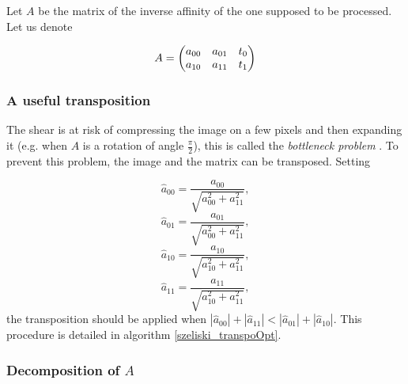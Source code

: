 	Let $A$ be the matrix of the inverse affinity of the one supposed to be processed. Let us denote

\[A = \begin{pmatrix} a_{00} & a_{01} & t_0\\ a_{10} & a_{11} & t_1 \end{pmatrix}\]

	
	
	
	\subsubsection{A useful transposition}
		\label{szeliski_transpoOpt_section}
		
		The shear is at risk of compressing the image on a few pixels and then expanding it (e.g. when $A$ is a rotation of angle $\frac{\pi}{2}$), this is called the \emph{bottleneck problem} \cite{wolberg1990digital}. To prevent this problem, the image and the matrix can be transposed. Setting
		
		
		\[\hat a_{00} = \frac{a_{00}}{\sqrt{a_{00}^2+a_{11}^2}},\]
		\[\hat a_{01} = \frac{a_{01}}{\sqrt{a_{00}^2+a_{11}^2}},\]
		\[\hat a_{10} = \frac{a_{10}}{\sqrt{a_{10}^2+a_{11}^2}},\]
		\[\hat a_{11} = \frac{a_{11}}{\sqrt{a_{10}^2+a_{11}^2}},\]
		the transposition should be applied when $|\hat a_{00}|+|\hat a_{11}|<|\hat a_{01}|+|\hat a_{10}|$.
		This procedure is detailed in algorithm \ref{szeliski_transpoOpt}.
		
	\subsubsection{Decomposition of $A$}
		\label{szeliski_decompositionDeA_section}
		\label{szeliski_frequencesMax_section}
		
